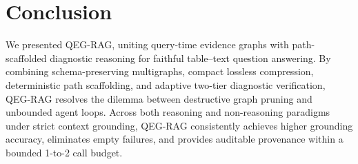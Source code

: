 \documentclass[runningheads]{llncs}
\begin{document}
\section{Conclusion}
\label{sec:conclusion}
We presented QEG-RAG, uniting query-time evidence graphs with path-scaffolded diagnostic reasoning for faithful table--text question answering. By combining schema-preserving multigraphs, compact lossless compression, deterministic path scaffolding, and adaptive two-tier diagnostic verification, QEG-RAG resolves the dilemma between destructive graph pruning and unbounded agent loops. Across both reasoning and non-reasoning paradigms under strict context grounding, QEG-RAG consistently achieves higher grounding accuracy, eliminates empty failures, and provides auditable provenance within a bounded 1-to-2 call budget.

\enlargethispage{4.0\baselineskip}
\makeatletter
\renewenvironment{thebibliography}[1]
     {\section*{\refname}%
      \def\@biblabel##1{##1.}%
      \fontsize{6.1pt}{7.1pt}\selectfont
      \list{\@biblabel{\@arabic\c@enumiv}}%
           {\settowidth\labelwidth{\@biblabel{#1}}%
            \leftmargin\labelwidth
            \advance\leftmargin\labelsep
            \setlength{\itemsep}{-1.2pt plus 0.2pt}%
            \setlength{\parsep}{0pt}%
            \setlength{\topsep}{0.5pt}%
            \usecounter{enumiv}%
            \let\p@enumiv\@empty
            \renewcommand\theenumiv{\@arabic\c@enumiv}}%
      \renewcommand\newblock{\hskip .11em \@plus.33em \@minus.07em}%
      \sloppy\clubpenalty4000\widowpenalty4000%
      \sfcode`\.=1000\relax}
     {\def\@noitemerr
       {\@latex@warning{Empty `thebibliography' environment}}%
      \endlist}
\makeatother


\end{document}
